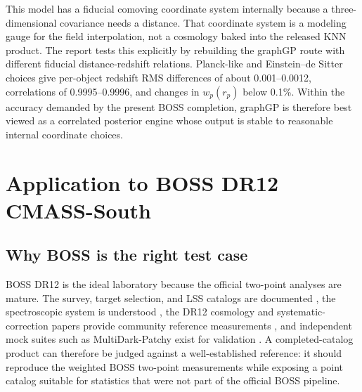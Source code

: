 \documentclass[apj]{emulateapj}
\begin{document}
This model has a fiducial comoving coordinate system internally because a
three-dimensional covariance needs a distance.  That coordinate system is a
modeling gauge for the field interpolation, not a cosmology baked into the
released KNN product.  The report tests this explicitly by rebuilding the
graphGP route with different fiducial distance-redshift relations.  Planck-like
and Einstein--de Sitter choices give per-object redshift RMS differences of
about 0.001--0.0012, correlations of 0.9995--0.9996, and changes in
$w_p(r_p)$ below 0.1\%.  Within the accuracy demanded by the present BOSS
completion, graphGP is therefore best viewed as a correlated posterior engine
whose output is stable to reasonable internal coordinate choices.

\section{Application to BOSS DR12 CMASS-South}
\label{sec:application}

\subsection{Why BOSS is the right test case}
\label{subsec:boss_context}

BOSS DR12 is the ideal laboratory because the official two-point analyses are
mature.  The survey, target selection, and LSS catalogs are documented
\citep{Dawson2013,Reid2016}, the spectroscopic system is understood
\citep{Smee2013}, the DR12 cosmology and systematic-correction papers provide
community reference measurements \citep{Alam2017,Ross2017}, and independent
mock suites such as MultiDark-Patchy exist for validation
\citep{Kitaura2016}.  A completed-catalog product can therefore be judged
against a well-established reference: it should reproduce the weighted BOSS
two-point measurements while exposing a point catalog suitable for statistics
that were not part of the official BOSS pipeline.
\end{document}
